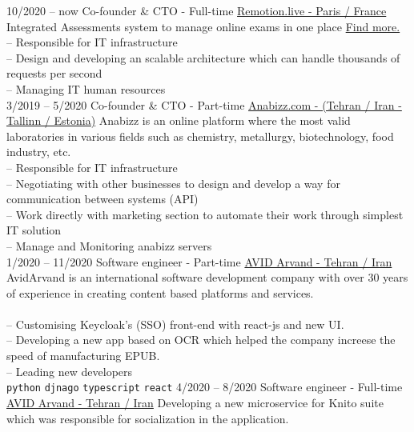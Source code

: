 \documentclass[9pt]{developercv}
\begin{document}
\begin{entrylist}
	\entry
	{10/2020 -- now}
	{Co-founder \& CTO - Full-time}
	{\href{https://remotion.live/}{Remotion.live - Paris / France }}
	{Integrated Assessments system to manage online exams in one place  \href{https://remotion.live/}{Find more.} \\
		-- Responsible for IT infrastructure  \\
		-- Design and developing an scalable architecture which can handle thousands of requests per second \\
		-- Managing IT human resources \\
	}
	\entry
	{3/2019 -- 5/2020}
	{Co-founder \& CTO - Part-time}
	{\href{https://www.e-krediidiinfo.ee/16152752-ANABIZZ OÜ}{Anabizz.com - (Tehran / Iran - Tallinn / Estonia)}}
	{Anabizz is an online platform where the most valid laboratories in various fields such as chemistry, metallurgy, biotechnology, food industry, etc. \\
		-- Responsible for IT infrastructure  \\
		-- Negotiating with other businesses to design and develop a way for communication between systems (API) \\
		-- Work directly with marketing section to automate their work through simplest IT solution \\
		-- Manage and Monitoring anabizz servers \\
	}
	\entry
	{1/2020 -- 11/2020}
	{Software engineer - Part-time}
	{
		\href{https://www.linkedin.com/company/avid-technology-development/}{AVID Arvand - Tehran / Iran}}
	{
		AvidArvand is an international software development company with over 30 years of experience in creating content based platforms and services. \\ \\
		-- Customising Keycloak's (SSO) front-end with react-js and new UI. \\
		-- Developing a new app based on OCR which helped the company increese the speed of manufacturing EPUB. \\
		-- Leading new developers \\
		\texttt{python}\slashsep
		\texttt{djnago}\slashsep
		\texttt{typescript}\slashsep
		\texttt{react}\slashsep
	}
	\entry
	{4/2020 -- 8/2020}
	{Software engineer - Full-time}
	{
		\href{https://www.linkedin.com/company/avid-technology-development/}
		{AVID Arvand - Tehran / Iran}}
	{
		Developing a new microservice for Knito suite which was responsible for socialization in the application.\\
}
\end{entrylist}
\end{document}
